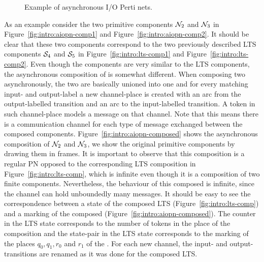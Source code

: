 \begin{figure}[ht]         
\centering
     \qquad\qquad
     \qquad
    
    \caption{Example of asynchronous I/O Perti nets.}
    \label{fig:intro:aiopn-group}
\end{figure}

As an example consider the two primitive \AIOPN components $\pnN_2$ and $\pnN_3$ in Figure~\ref{fig:intro:aiopn-comp1} and Figure~\ref{fig:intro:aiopn-comp2}. It should be clear that these two components correspond to the two previously described LTS components $\S_4$ and $\S_5$ in Figure~\ref{fig:intro:lts-comp1} and Figure~\ref{fig:intro:lts-comp2}. 
Even though the components are very similar to the LTS components, the asynchronous composition of \AIOPNs is somewhat different. When composing two \AIOPNs asynchronously, the two \AIOPNs are basically unioned into one \AIOPN and for every matching input- and output-label a new channel-place is created with an arc from the output-labelled transition and an arc to the input-labelled transition. A token in such channel-place models a message on that channel. Note that this means there is a communication channel for each type of message exchanged between the composed components.
Figure~\ref{fig:intro:aiopn-composed} shows the asynchronous composition of $\pnN_2$ and $\pnN_3$, we show the original primitive components by drawing them in frames. It is important to observe that this composition is a regular PN opposed to the corresponding LTS composition in Figure~\ref{fig:intro:lts-comp}, which is infinite even though it is a composition of two finite components. Nevertheless, the behaviour of this composed \AIOPN is infinite, since the  channel can hold unboundedly many messages. It should be easy to see the correspondence between a state of the composed LTS (Figure~\ref{fig:intro:lts-comp}) and a marking of the composed \AIOPN(Figure~\ref{fig:intro:aiopn-composed}). The counter in the LTS state corresponds to the number of tokens in the  place of the \AIOPN composition and the state-pair in the LTS state corresponds to the marking of the places $q_0, q_1, r_0$ and $ r_1$ of the \AIOPN. For each new channel, the input- and output-transitions are renamed as it was done for the composed LTS.

